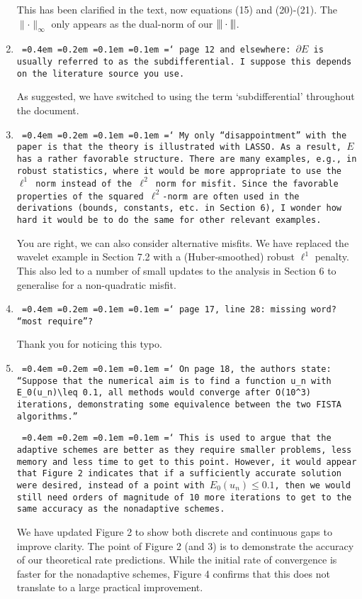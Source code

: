 \documentclass[12pt]{article}
\newcommand*\justify{%
	\fontdimen2\font=0.4em%
	\fontdimen3\font=0.2em%
	\fontdimen4\font=0.1em%
	\fontdimen7\font=0.1em%
	\hyphenchar\font=`\-%
}
\newcommand{\review}[1]{\texttt{\justify{#1}}}
\begin{document}
\begin{enumerate}
	This has been clarified in the text, now equations (15) and (20)-(21). The $\lVert\cdot\rVert_\infty$ only appears as the dual-norm of our ${\vert\kern-0.25ex\vert\kern-0.25ex\vert \cdot \vert\kern-0.25ex\vert\kern-0.25ex\vert}$.
	
	\item \review{page 12 and elsewhere: $\partial E$ is usually referred to as the subdifferential. I suppose this depends on the literature source you use.}
	
	As suggested, we have switched to using the term `subdifferential' throughout the document.
	
	\item \review{My only ``disappointment'' with the paper is that the theory is illustrated with LASSO. As a result, $E$ has a rather favorable structure. There are many examples, e.g., in robust statistics, where it would be more appropriate to use the $\ell^1$ norm instead of the $\ell^2$ norm for misfit. Since the favorable properties of the squared $\ell^2$-norm are often used in the derivations (bounds, constants, etc. in Section 6), I wonder how hard it would be to do the same for other relevant examples.}
	
	You are right, we can also consider alternative misfits. We have replaced the wavelet example in Section 7.2 with a (Huber-smoothed) robust $\ell^1$ penalty. This also led to a number of small updates to the analysis in Section 6 to generalise for a non-quadratic misfit.
	
	\item \review{page 17, line 28: missing word? ``most require''?}
	
	Thank you for noticing this typo.
	
	\item \review{On page 18, the authors state: ``Suppose that the numerical aim is to find a function $u_n$ with $E_0(u_n)\leq 0.1$, all methods would converge after $O(10^3)$ iterations, demonstrating some equivalence between the two FISTA algorithms.''}
	
	\review{This is used to argue that the adaptive schemes are better as they require smaller problems, less memory and less time to get to this point. However, it would appear that Figure 2 indicates that if a sufficiently accurate solution were desired, instead of a point with $E_0(u_n)\leq 0.1$, then we would still need orders of magnitude of 10 more iterations to get to the same accuracy as the nonadaptive schemes.}
	
	We have updated Figure 2 to show both discrete and continuous gaps to improve clarity. The point of Figure 2 (and 3) is to demonstrate the accuracy of our theoretical rate predictions. While the initial rate of convergence is faster for the nonadaptive schemes, Figure 4 confirms that this does not translate to a large practical improvement.
\end{enumerate}
\end{document}
